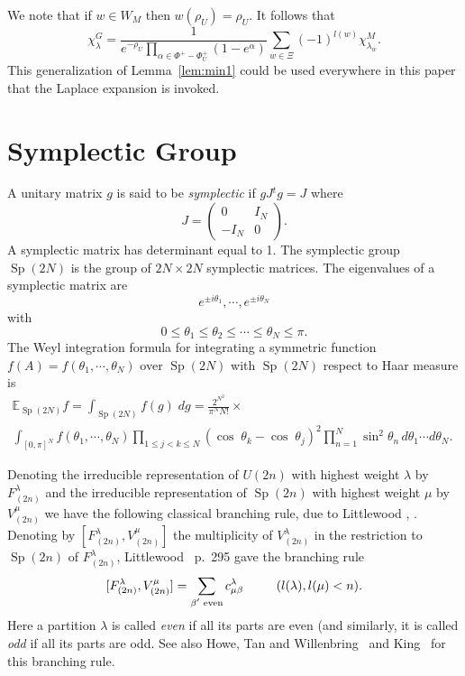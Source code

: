 \documentclass[11pt]{amsart}
\newcommand{\tmem}[1]{{\em #1\/}}
\newcommand{\tmop}[1]{\ensuremath{\operatorname{#1}}}
\begin{document}
We note that if $w \in W_M$ then $w ( \rho_U ) = \rho_U$. It
follows that
\[ \chi_{\lambda}^G = \frac{1}{e^{- \rho_U} \prod_{\alpha \in \Phi^+ -
   \Phi_U^+} ( 1 - e^{\alpha} )} \sum_{w \in \Xi} ( - 1 )^{l ( w )}
   \chi^M_{\lambda_w} . \]
This generalization of Lemma~\ref{lem:min1} could be used
everywhere in this paper that the Laplace expansion is invoked.


\section{Symplectic Group}\label{sec:sp}

A unitary matrix $g$ is said to be {\tmem{symplectic}} if $gJ {^t
g} = J$ where
\[ J = \left( \begin{array}{cc}
     0 & I_N\\
     - I_N & 0
   \end{array} \right) . \]
A symplectic matrix has determinant equal to 1. The symplectic
group $\tmop{Sp} ( 2 N )$ is the group of $2 N \times 2 N$
symplectic matrices. The eigenvalues of a symplectic matrix are
\[ e^{\pm i \theta_1}, \cdots, e^{\pm i \theta_N} \]
with
\[ 0 \leqslant \theta_1 \leqslant \theta_2 \leqslant \cdots \leqslant \theta_N \leqslant \pi . \]
The Weyl integration formula {\cite{weyl}} for integrating a
symmetric function $f ( A ) = f ( \theta_1, \cdots, \theta_N )$
over $\tmop{Sp} ( 2 N )$ with $\tmop{Sp} ( 2 N )$ respect to Haar
measure is
\begin{eqnarray*}
  \mathbb{E}_{\tmop{Sp} ( 2 N )} f = \int_{\tmop{Sp} ( 2 N )} f ( g ) \; d g
   =  \frac{2^{N^2}}{\pi^N N!} \times&&\\
  \int_{[ 0, \pi ]^N} f ( \theta_1, \cdots, \theta_N ) \prod_{1 \leqslant j < k \le
  N} ( \cos \; \theta_k - \cos \; \theta_j )^2 \prod_{n = 1}^N \sin^2 \theta_n
  \, d \theta_1 \cdots d \theta_N . &  &
\end{eqnarray*}




Denoting the irreducible representation of $U ( 2 n )$ with
highest weight $\lambda$ by $F^{\lambda}_{( 2 n )}$ and the
irreducible representation of $\tmop{Sp} ( 2 n )$ with highest
weight $\mu$ by $V^{\mu}_{( 2 n )}$ we have the following
classical branching rule, due to Littlewood {\cite{Li2}},
{\cite{Li}}. Denoting by $[ F^{\lambda}_{( 2 n )}, V^{\mu}_{( 2 n
)} ]$ the multiplicity of $V_{( 2 n )}^{\lambda}$ in the
restriction to $\tmop{Sp} ( 2 n )$ of $F^{\lambda}_{( 2 n )}$,
Littlewood~{\cite{Li}} p.~295 gave the branching rule
\begin{equation}
  \label{e:bsym} [ F^{\lambda}_{( 2 n )}, V^{\mu}_{( 2 n )} ] =
  \sum_{\text{$\beta'$ even}} c^{\lambda}_{\mu \beta} \hspace{2.6em} ( l (
  \lambda ), l ( \mu ) < n ) .
\end{equation}
Here a partition $\lambda$ is called {\it even} if all its parts
are even (and similarly, it is called {\it odd} if all its parts
are odd. See also Howe, Tan and
Willenbring~{\cite{HoweTanWillenbring}} and
King~{\cite{KingBranching}} for this branching rule.
\end{document}
